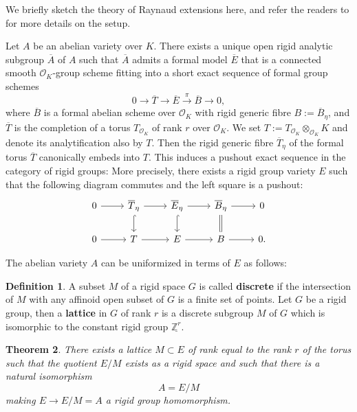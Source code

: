 \documentclass[10pt,oneside]{amsart}
\newtheorem{theorem}{Theorem}[section]
\theoremstyle{definition}
\newtheorem{definition}[theorem]{Definition}
\begin{document}
        We briefly sketch the theory of Raynaud extensions here, and refer the readers to \cite{Bosch-Lut, Lut-survey, Lut} for more details on the setup.

	Let $A$ be an abelian variety over $K$. There exists a unique open rigid analytic subgroup $\overline A$ of $A$ such that $\overline A$ admits a formal model $\overline E$ that is a connected smooth $\mathcal O_K$-group scheme fitting into a short exact sequence of formal group schemes
	\begin{equation}\label{formal Raynaud extension}
	0\rightarrow \overline T \rightarrow \overline E \xrightarrow{\pi} \overline{B}\rightarrow 0,
	\end{equation}
	where $\overline{B}$ is a formal abelian scheme over $\mathcal O_K$ with rigid generic fibre $B:=\overline{B}_\eta$, and $\overline{T}$ is the completion of a torus $T_{\mathcal O_K}$ of rank $r$ over $\mathcal O_K$.
	We set $T:=T_{\mathcal O_K}\otimes_{\mathcal O_K}K$ and denote its analytification also by $T$. Then the rigid generic fibre $\overline{T}_\eta$ of the formal torus $\overline{T}$ canonically embeds into $T$. This induces a pushout exact sequence in the category of rigid groups: More precisely, there exists a rigid group variety $E$ such that the following diagram commutes and the left square is a pushout:
		\begin{equation}\label{Raynaud diagram}
		\begin{tikzcd}
			0 \arrow[r] & \overline{T}_\eta \arrow[d, hook] \arrow[r] & \overline{E}_\eta \arrow[d, hook] \arrow[r] & \overline{B}_\eta \arrow[d,equal] \arrow[r] & 0 \\
			0 \arrow[r] & T \arrow[r] & E \arrow[r] & B \arrow[r] & 0.
		\end{tikzcd}
		\end{equation}
	
	The abelian variety $A$ can be uniformized in terms of $E$ as follows:
	
	\begin{definition}
		A subset $M$ of a rigid space $G$ is called \textbf{discrete} if the intersection of $M$ with any affinoid open subset of $G$ is a finite set of points.
		Let $G$ be a rigid group, then a \textbf{lattice} in $G$ of rank $r$ is a discrete subgroup $M$ of $G$ which is isomorphic to the constant rigid group $\underline{\mathbb Z^r}$. 
	\end{definition}
	
	\begin{theorem}\label{Raynaud uniformisation}
		There exists a lattice $M \subset E$ of rank equal to the rank $r$ of the torus such that the quotient $E/M$ exists as a rigid space and such that there is a natural isomorphism
		\[A=E/M\]
making $E\rightarrow E/M=A$ a rigid group homomorphism. 
	\end{theorem}
	
\end{document}
